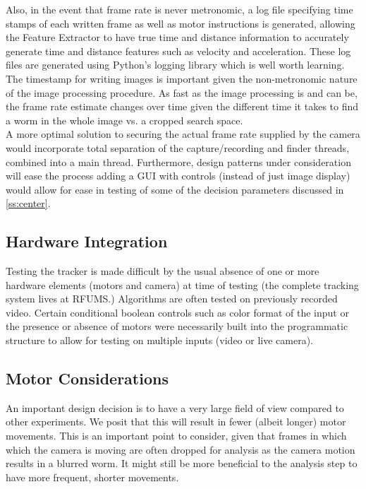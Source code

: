 \documentclass[main.tex]{subfiles}
\begin{document}
Also, in the event that frame rate is never metronomic, a log file specifying time stamps of each written frame as well as motor instructions is generated, allowing the Feature Extractor to have true time and distance information to accurately generate time and distance features such as velocity and acceleration. These log files are generated using Python's logging library which is well worth learning. The timestamp for writing images is important given the non-metronomic nature of the image processing procedure. As fast as the image processing is and can be, the frame rate estimate changes over time given the different time it takes to find a worm in the whole image vs. a cropped search space. \\

A more optimal solution to securing the actual frame rate supplied by the camera would incorporate total separation of the capture/recording and finder threads, combined into a main thread. Furthermore, design patterns under consideration will ease the process adding a GUI with controls (instead of just image display) would allow for ease in testing of some of the decision parameters discussed in \ref{ss:center}.


\subsection{Hardware Integration} Testing the tracker is made difficult by the usual absence of one or more hardware elements (motors and camera) at time of testing (the complete tracking system lives at RFUMS.) Algorithms are often tested on previously recorded video. Certain conditional boolean controls such as color format of the input or the presence or absence of motors were necessarily built into the programmatic structure to allow for testing on multiple inputs (video or live camera).

\subsection{Motor Considerations}
An important design decision is to have a very large field of view compared to other experiments. We posit that this will result in fewer (albeit longer) motor movements. This is an important point to consider, given that frames in which which the camera is moving are often dropped for analysis as the camera motion results in a blurred worm. It might still be more beneficial to the analysis step to have more frequent, shorter movements. 
\end{document}
